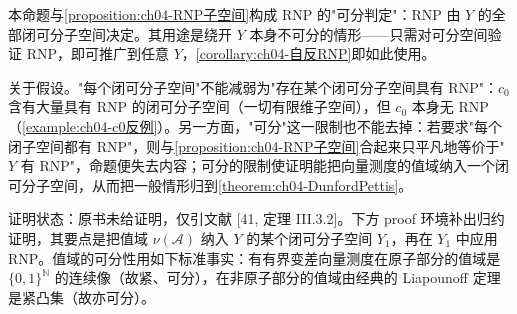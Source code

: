 \documentclass[../../main.tex]{subfiles}%
\begin{document}
\begin{remark}\label{remark:ch04-RNP可分子空间}
本命题与\cref{proposition:ch04-RNP子空间}构成 RNP 的"可分判定"：RNP 由 $Y$ 的全部闭可分子空间决定。其用途是绕开 $Y$ 本身不可分的情形——只需对可分空间验证 RNP，即可推广到任意 $Y$，\cref{corollary:ch04-自反RNP}即如此使用。

关于假设。"每个闭可分子空间"不能减弱为"存在某个闭可分子空间具有 RNP"：$c_0$ 含有大量具有 RNP 的闭可分子空间（一切有限维子空间），但 $c_0$ 本身无 RNP（\cref{example:ch04-c0反例}）。另一方面，"可分"这一限制也不能去掉：若要求"每个闭子空间都有 RNP"，则与\cref{proposition:ch04-RNP子空间}合起来只平凡地等价于"$Y$ 有 RNP"，命题便失去内容；可分的限制使证明能把向量测度的值域纳入一个闭可分子空间，从而把一般情形归到\cref{theorem:ch04-DunfordPettis}。

证明状态：原书未给证明，仅引文献 [41, 定理 III.3.2]。下方 proof 环境补出归约证明，其要点是把值域 $\nu(\mathcal{A})$ 纳入 $Y$ 的某个闭可分子空间 $Y_1$，再在 $Y_1$ 中应用 RNP。值域的可分性用如下标准事实：有有界变差向量测度在原子部分的值域是 $\{0,1\}^{\mathbb{N}}$ 的连续像（故紧、可分），在非原子部分的值域由经典的 Liapounoff 定理是紧凸集（故亦可分）。
\end{remark}
\end{document}
